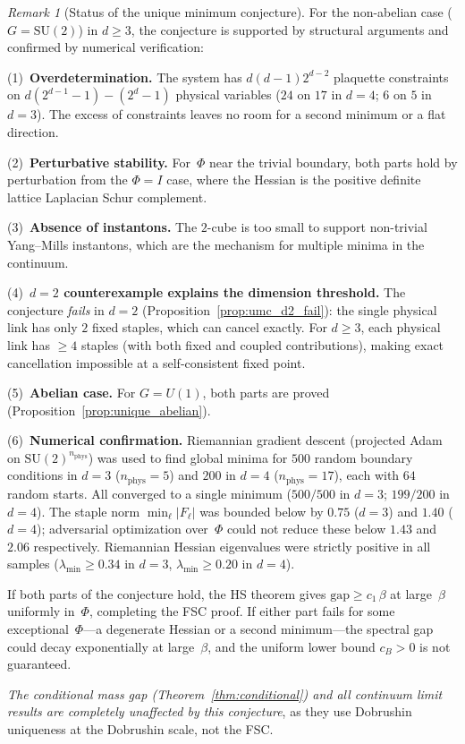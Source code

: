 \documentclass[11pt,a4paper]{article}
\theoremstyle{plain}
\theoremstyle{definition}
\theoremstyle{remark}
\newtheorem{remark}[theorem]{Remark}
\newcommand{\SU}{\mathrm{SU}}
\newcommand{\gap}{\mathrm{gap}}
\begin{document}
\begin{remark}[Status of the unique minimum conjecture]
\label{rem:umc}
For the non-abelian case ($G = \SU(2)$) in $d \geq 3$,
the conjecture is supported by structural arguments
and confirmed by numerical verification:

\textup{(1)}~\textbf{Overdetermination.}
The system has $d(d{-}1)2^{d-2}$
plaquette constraints on $d(2^{d-1} - 1) - (2^d - 1)$
physical variables
($24$ on $17$ in $d = 4$; $6$ on $5$ in $d = 3$).
The excess of constraints leaves no room for a second
minimum or a flat direction.

\textup{(2)}~\textbf{Perturbative stability.}
For~$\Phi$ near the trivial boundary,
both parts hold by perturbation from the $\Phi = I$ case,
where the Hessian is the positive definite lattice
Laplacian Schur complement.

\textup{(3)}~\textbf{Absence of instantons.}
The $2$-cube is too small to support
non-trivial Yang--Mills instantons, which are the
mechanism for multiple minima in the continuum.

\textup{(4)}~\textbf{$d = 2$ counterexample explains the
dimension threshold.}
The conjecture \emph{fails} in $d = 2$
(Proposition~\ref{prop:umc_d2_fail}): the single physical
link has only $2$ fixed staples, which can cancel exactly.
For $d \geq 3$, each physical link has $\geq 4$ staples
(with both fixed and coupled contributions), making
exact cancellation impossible at a self-consistent
fixed point.

\textup{(5)}~\textbf{Abelian case.}
For $G = U(1)$, both parts
are proved (Proposition~\ref{prop:unique_abelian}).

\textup{(6)}~\textbf{Numerical confirmation.}
Riemannian gradient descent (projected Adam on
$\SU(2)^{n_{\mathrm{phys}}}$) was used to find global
minima for $500$ random boundary conditions in $d = 3$
($n_{\mathrm{phys}} = 5$) and $200$ in $d = 4$
($n_{\mathrm{phys}} = 17$), each with $64$ random starts.
All converged to a single minimum
($500/500$ in $d = 3$; $199/200$ in $d = 4$).
The staple norm $\min_\ell |F_\ell|$ was bounded below by
$0.75$ ($d = 3$) and $1.40$ ($d = 4$); adversarial
optimization over~$\Phi$ could not reduce these below
$1.43$ and $2.06$ respectively.
Riemannian Hessian eigenvalues were strictly positive in
all samples ($\lambda_{\min} \geq 0.34$ in $d = 3$,
$\lambda_{\min} \geq 0.20$ in $d = 4$).

If both parts of the conjecture hold, the HS theorem gives
$\gap \geq c_1\,\beta$ at large~$\beta$
uniformly in~$\Phi$, completing the FSC proof.
If either part fails for some exceptional~$\Phi$---a
degenerate Hessian or a second minimum---the
spectral gap could decay exponentially at
large~$\beta$, and the uniform lower bound $c_B > 0$
is not guaranteed.

\emph{The conditional mass gap
\textup{(}Theorem~\ref{thm:conditional}\textup{)} and all
continuum limit results are completely unaffected by
this conjecture}, as they use Dobrushin uniqueness
at the Dobrushin scale, not the FSC.
\end{remark}
\end{document}
